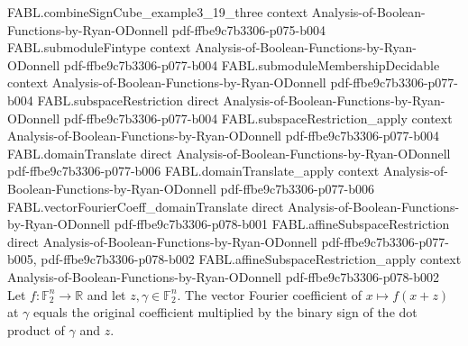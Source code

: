 \begin{theorem}
\proofstep
  {FABL.combineSignCube_example3_19_three}
  {context}
  {Analysis-of-Boolean-Functions-by-Ryan-ODonnell}
  {pdf-ffbe9c7b3306-p075-b004}
\proofstep
  {FABL.submoduleFintype}
  {context}
  {Analysis-of-Boolean-Functions-by-Ryan-ODonnell}
  {pdf-ffbe9c7b3306-p077-b004}
\proofstep
  {FABL.submoduleMembershipDecidable}
  {context}
  {Analysis-of-Boolean-Functions-by-Ryan-ODonnell}
  {pdf-ffbe9c7b3306-p077-b004}
\proofstep
  {FABL.subspaceRestriction}
  {direct}
  {Analysis-of-Boolean-Functions-by-Ryan-ODonnell}
  {pdf-ffbe9c7b3306-p077-b004}
\proofstep
  {FABL.subspaceRestriction_apply}
  {context}
  {Analysis-of-Boolean-Functions-by-Ryan-ODonnell}
  {pdf-ffbe9c7b3306-p077-b004}
\proofstep
  {FABL.domainTranslate}
  {direct}
  {Analysis-of-Boolean-Functions-by-Ryan-ODonnell}
  {pdf-ffbe9c7b3306-p077-b006}
\proofstep
  {FABL.domainTranslate_apply}
  {context}
  {Analysis-of-Boolean-Functions-by-Ryan-ODonnell}
  {pdf-ffbe9c7b3306-p077-b006}
\proofstep
  {FABL.vectorFourierCoeff_domainTranslate}
  {direct}
  {Analysis-of-Boolean-Functions-by-Ryan-ODonnell}
  {pdf-ffbe9c7b3306-p078-b001}
\proofstep
  {FABL.affineSubspaceRestriction}
  {direct}
  {Analysis-of-Boolean-Functions-by-Ryan-ODonnell}
  {pdf-ffbe9c7b3306-p077-b005,
    pdf-ffbe9c7b3306-p078-b002}
\proofstep
  {FABL.affineSubspaceRestriction_apply}
  {context}
  {Analysis-of-Boolean-Functions-by-Ryan-ODonnell}
  {pdf-ffbe9c7b3306-p078-b002}
Let $f\colon\mathbb F_2^n\to\mathbb R$ and let $z,\gamma\in\mathbb F_2^n$. The vector
Fourier coefficient of $x\mapsto f(x+z)$ at $\gamma$ equals the original coefficient
multiplied by the binary sign of the dot product of $\gamma$ and $z$.
\end{theorem}

